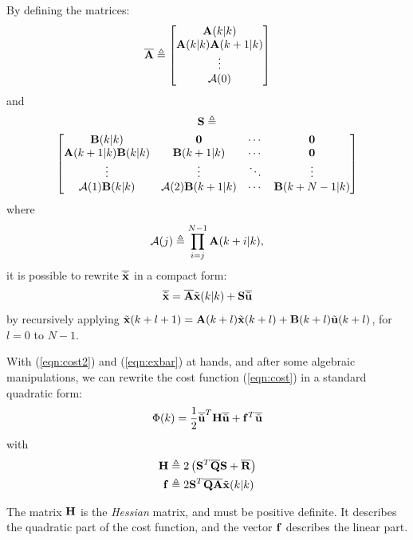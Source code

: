 \documentclass[twocolumn]{IEEEtran} %
\begin{document}
By defining the matrices:
\begin{equation*}
	\overline{\bf A} \triangleq \begin{bmatrix}
		{\bf A}(k|k) \\ {\bf A}(k|k){\bf A}(k+1|k) \\ \vdots \\ {\cal A}(0)
	\end{bmatrix}
\end{equation*}
and
{\small
\begin{multline*}
		{\bf S} \triangleq \\ \begin{bmatrix}
			{\bf B}(k|k)		  & {\bf 0} 			   & \cdots & {\bf 0}        \\
			{\bf A}(k+1|k){\bf B}(k|k)& {\bf B}(k+1|k)      	   & \cdots & {\bf 0}        \\
			\vdots			  & \vdots		        & \ddots & \vdots         \\
			{\cal A}(1){\bf B}(k|k) & {\cal A}(2){\bf B}(k+1|k) & \cdots & {\bf B}(k+N-1|k)
		\end{bmatrix}
\end{multline*}
}
where 
\begin{equation*}
	{\cal A}(j) \triangleq \prod_{i=j}^{N-1}{\bf A}(k+i|k),
\end{equation*}
it is possible to rewrite $\overline{\tilde{\bf x}}$ in a compact form:
\begin{equation}\label{eqn:exbar}
	\overline{\tilde{\bf x}}=\overline{\bf A}\tilde{\bf x}(k|k)+{\bf S}\overline{\tilde{\bf u}}
\end{equation}
by recursively applying $\tilde{\bf x}(k+l+1)={\bf A}(k+l)\tilde{\bf x}(k+l)+{\bf B}(k+l)\tilde{\bf u}(k+l)$, for $l=0$ to $N-1$.

With (\ref{eqn:cost2}) and (\ref{eqn:exbar}) at hands, and after some algebraic manipulations, we can rewrite the cost function (\ref{eqn:cost}) in a standard quadratic form:
\begin{equation}
	\Phi(k) = \frac{1}{2}\overline{\tilde{\bf u}}^T{\bf H}\overline{\tilde{\bf u}} + {\bf f}^T\overline{\tilde{\bf u}}
\end{equation}
with
\begin{align*}
	{\bf H} &\triangleq 2\left({\bf S}^T\overline{\bf Q}{\bf S}+\overline{\bf R}\right) \\
	{\bf f} &\triangleq 2{\bf S}^T\overline{\bf Q}\overline{\bf A}\tilde{\bf x}(k|k)
\end{align*}

The matrix ${\bf H}$ is the {\em Hessian} matrix, and must be positive definite. It describes the quadratic part of the cost function, and the vector ${\bf f}$ describes the linear part. 
\end{document}
